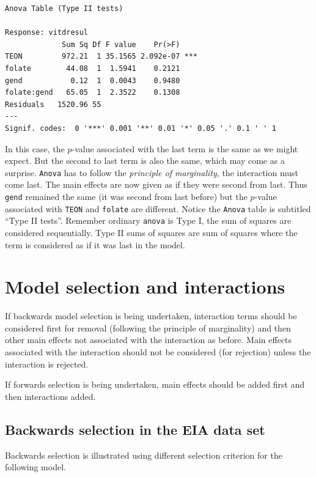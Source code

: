 \documentclass[
  oneside]{krantz}
\begin{document}
\begin{verbatim}
Anova Table (Type II tests)

Response: vitdresul
             Sum Sq Df F value    Pr(>F)    
TEON         972.21  1 35.1565 2.092e-07 ***
folate        44.08  1  1.5941    0.2121    
gend           0.12  1  0.0043    0.9480    
folate:gend   65.05  1  2.3522    0.1308    
Residuals   1520.96 55                      
---
Signif. codes:  0 '***' 0.001 '**' 0.01 '*' 0.05 '.' 0.1 ' ' 1
\end{verbatim}

In this case, the \(p\)-value associated with the last term is the same as we might expect. But the second to last term is also the same, which may come as a surprise. \texttt{Anova} has to follow the \emph{principle of marginality}, the interaction must come last. The main effects are now given as if they were second from last. Thus \texttt{gend} remained the same (it was second from last before) but the \(p\)-value associated with \texttt{TEON} and \texttt{folate} are different. Notice the \texttt{Anova} table is subtitled ``Type II tests''. Remember ordinary \texttt{anova} is Type I, the sum of squares are considered sequentially. Type II sums of squares are sum of squares where the term is considered as if it was last in the model.

\hypertarget{model-selection-and-interactions}{%
\section{Model selection and interactions}\label{model-selection-and-interactions}}

If backwards model selection is being undertaken, interaction terms should be considered first for removal (following the principle of marginality) and then other main effects not associated with the interaction as before. Main effects associated with the interaction should not be considered (for rejection) unless the interaction is rejected.

If forwards selection is being undertaken, main effects should be added first and then interactions added.

\hypertarget{backwards-selection-in-the-eia-data-set}{%
\subsection{Backwards selection in the EIA data set}\label{backwards-selection-in-the-eia-data-set}}

Backwards selection is illustrated using different selection criterion for the following model.
\end{document}
